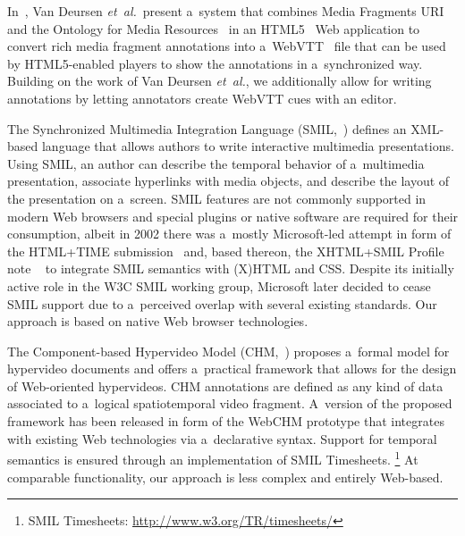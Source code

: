 \documentclass{sig-alternate}
\newcommand{\inlinelistingsize}{\fontsize{8pt}{11pt}}
\let\oldurl\url
\renewcommand{\url}[1]{\inlinelistingsize\oldurl{#1}}
\begin{document}
In~\cite{vandeursen2012mediafragmentannotations},
Van Deursen \emph{et~al.}\ present a~system
that combines Media Fragments URI~\cite{troncy2012mediafragments}
and the Ontology for Media Resources~\cite{lee2012mediaontology}
in an HTML5~\cite{berjon2013html5}
Web application to convert rich media fragment annotations
into a~WebVTT~\cite{pfeiffer2013webvtt} file
that can be used by HTML5-enabled players
to show the annotations in a~synchronized way.
Building on the work of Van Deursen \emph{et~al.},
we additionally allow for writing annotations by
letting annotators create WebVTT cues with an editor.

The Synchronized Multimedia Integration Language\linebreak
(SMIL,~\cite{bulterman2006smil})
defines an XML-based language that allows authors
to write interactive multimedia presentations.
Using SMIL, an author can describe the temporal behavior
of a~multimedia presentation, associate hyperlinks
with media objects, and describe the layout
of the presentation on a~screen.
SMIL features are not commonly supported
in modern Web browsers and special plugins or native software
are required for their consumption,
albeit in 2002 there was a~mostly Microsoft-led attempt
in form of the HTML+TIME submission~\cite{schmitz1998htmltime}
and, based thereon, the XHTML+SMIL Profile note%
~\cite{newman2002xhtmlsmil}
to integrate SMIL semantics with (X)HTML and CSS.
Despite its initially active role in the W3C SMIL working group,
Microsoft later decided to cease SMIL support
due to a~perceived overlap with several existing standards.
Our approach is based on native Web browser technologies.

The Component-based Hypervideo Model
(CHM,~\cite{sadallah2012hypervideo})
proposes a~formal model for hypervideo documents
and offers a~practical framework that allows for
the design of Web-oriented hypervideos.
CHM annotations are defined as any kind of data associated to
a~logical spatiotemporal video fragment.
A~version of the proposed framework
has been released in form of the WebCHM prototype
that integrates with existing Web technologies
via a~declarative syntax.
Support for temporal semantics is ensured through
an implementation of SMIL Timesheets.%
\footnote{SMIL Timesheets:
\url{http://www.w3.org/TR/timesheets/}}
At comparable functionality, our approach is less complex
and entirely Web-based.
\end{document}
